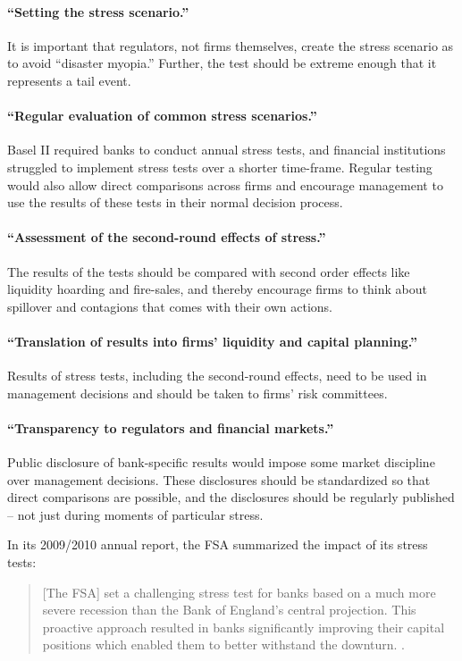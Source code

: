 \documentclass[12pt]{article}
\begin{document}
\paragraph{``Setting the stress scenario.''} It is important that regulators, not firms themselves, create the stress scenario as to avoid ``disaster myopia.'' Further, the test should be extreme enough that it represents a tail event. 

\paragraph{``Regular evaluation of common stress scenarios.''} Basel II required banks to conduct annual stress tests, and financial institutions struggled to implement stress tests over a shorter time-frame. Regular testing would also allow direct comparisons across firms and encourage management to use the results of these tests in their normal decision process.

\paragraph{``Assessment of the second-round effects of stress.''} The results of the tests should be compared with second order effects like liquidity hoarding and fire-sales, and thereby encourage firms to think about spillover and contagions that comes with their own actions. 

\paragraph{``Translation of results into firms' liquidity and capital planning.''} Results of stress tests, including the second-round effects, need to be used in management decisions and should be taken to firms' risk committees. 

\paragraph{``Transparency to regulators and financial markets.''} Public disclosure of bank-specific results would impose some market discipline over management decisions. These disclosures should be standardized so that direct comparisons are possible, and the disclosures should be regularly published -- not just during moments of particular stress.


In its 2009/2010 annual report, the FSA summarized the impact of its stress tests:

\begin{quote}
[The FSA] set a challenging stress test for banks based on a much more severe recession than the Bank of England’s central projection. This proactive approach resulted in banks significantly improving their capital positions which enabled them to better withstand the downturn. \citep{FSAReport}.
\end{quote}
\end{document}
